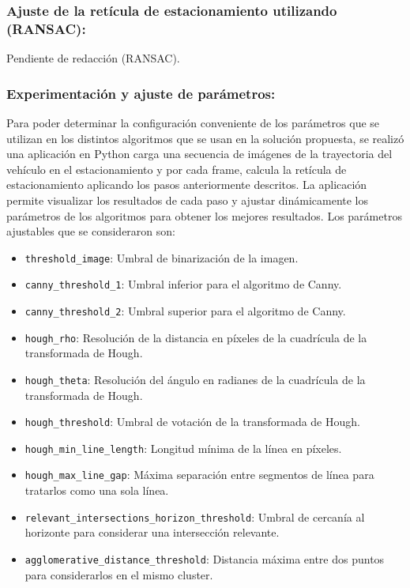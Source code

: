 \subsubsection{Ajuste de la retícula de estacionamiento utilizando (RANSAC):}
Pendiente de redacción (RANSAC).


\subsubsection{Experimentación y ajuste de parámetros:}\label{subsec:experimentacion-y-ajuste-de-parametros:}
\noindent
Para poder determinar la configuración conveniente de los parámetros que se utilizan en los distintos algoritmos que se usan en la solución propuesta,
se realizó una aplicación en Python carga una secuencia de imágenes de la trayectoria del vehículo en el estacionamiento y por cada frame,
calcula la retícula de estacionamiento aplicando los pasos anteriormente descritos.
La aplicación permite visualizar los resultados de cada paso y ajustar dinámicamente los parámetros de los algoritmos para obtener los mejores resultados.
Los parámetros ajustables que se consideraron son:
\begin{itemize}
    \item \texttt{threshold\_image}: Umbral de binarización de la imagen.
    \item \texttt{canny\_threshold\_1}: Umbral inferior para el algoritmo de Canny.
    \item \texttt{canny\_threshold\_2}: Umbral superior para el algoritmo de Canny.
    \item \texttt{hough\_rho}: Resolución de la distancia en píxeles de la cuadrícula de la transformada de Hough.
    \item \texttt{hough\_theta}: Resolución del ángulo en radianes de la cuadrícula de la transformada de Hough.
    \item \texttt{hough\_threshold}: Umbral de votación de la transformada de Hough.
    \item \texttt{hough\_min\_line\_length}: Longitud mínima de la línea en píxeles.
    \item \texttt{hough\_max\_line\_gap}: Máxima separación entre segmentos de línea para tratarlos como una sola línea.
    \item \texttt{relevant\_intersections\_horizon\_threshold}: Umbral de cercanía al horizonte para considerar una intersección relevante.
    \item \texttt{agglomerative\_distance\_threshold}: Distancia máxima entre dos puntos para considerarlos en el mismo cluster.
\end{itemize}
